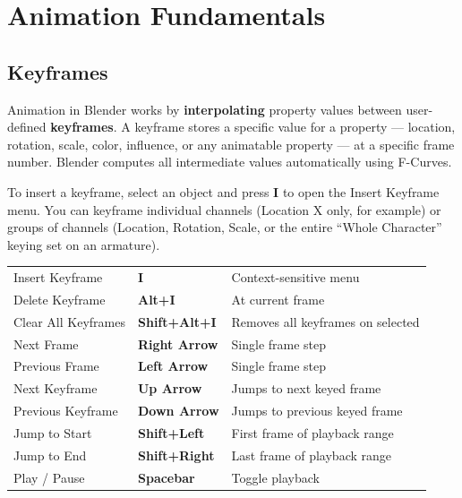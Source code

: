 \section{Animation Fundamentals}
\label{sec:anim-fundamentals}

\subsection{Keyframes}
\label{subsec:keyframes}

Animation in Blender works by \textbf{interpolating} property values between user-defined \textbf{keyframes}. A keyframe stores a specific value for a property --- location, rotation, scale, color, influence, or any animatable property --- at a specific frame number. Blender computes all intermediate values automatically using F-Curves.

To insert a keyframe, select an object and press \textbf{I} to open the Insert Keyframe menu. You can keyframe individual channels (Location X only, for example) or groups of channels (Location, Rotation, Scale, or the entire ``Whole Character'' keying set on an armature).

\begin{shortcutbox}
\begin{center}
\begin{tabularx}{\textwidth}{L{5cm}C{3.5cm}X}
\toprule
{}
 &  &  \\
\midrule
Insert Keyframe & \textbf{I} & Context-sensitive menu \\
Delete Keyframe & \textbf{Alt+I} & At current frame \\
Clear All Keyframes & \textbf{Shift+Alt+I} & Removes all keyframes on selected \\
Next Frame & \textbf{Right Arrow} & Single frame step \\
Previous Frame & \textbf{Left Arrow} & Single frame step \\
Next Keyframe & \textbf{Up Arrow} & Jumps to next keyed frame \\
Previous Keyframe & \textbf{Down Arrow} & Jumps to previous keyed frame \\
Jump to Start & \textbf{Shift+Left} & First frame of playback range \\
Jump to End & \textbf{Shift+Right} & Last frame of playback range \\
Play / Pause & \textbf{Spacebar} & Toggle playback \\
\bottomrule
\end{tabularx}
\end{center}
\end{shortcutbox}

